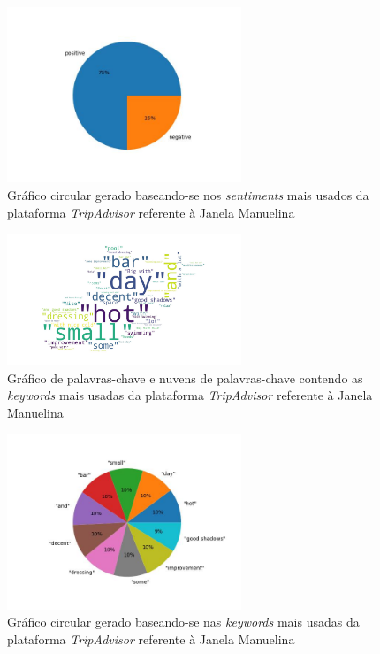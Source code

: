     \begin{figure}[!htb]
    \centering
    \includegraphics[width=7cm]{figuras/TripAdvisor/Activities/place21_sentiments.jpeg}
    \caption{Gráfico circular gerado baseando-se nos \textit{sentiments} mais usados da plataforma \textit{TripAdvisor} referente à Janela Manuelina}
    \label{fig:exemplofig}
    \end{figure}
    
    \begin{figure}[!htb]
    \centering
    \includegraphics[width=7cm]{figuras/TripAdvisor/Activities/place21_keywordcloud.jpeg}
    \caption{Gráfico de palavras-chave e nuvens de palavras-chave contendo as \textit{keywords} mais usadas da plataforma \textit{TripAdvisor} referente à Janela Manuelina}
    \label{fig:exemplofig}
    \end{figure}
    
    \begin{figure}[!htb]
    \centering
    \includegraphics[width=7cm]{figuras/TripAdvisor/Activities/place21_keywords.jpeg}
    \caption{Gráfico circular gerado baseando-se nas \textit{keywords} mais usadas da plataforma \textit{TripAdvisor} referente à Janela Manuelina}
    \label{fig:exemplofig}
    \end{figure}
    
